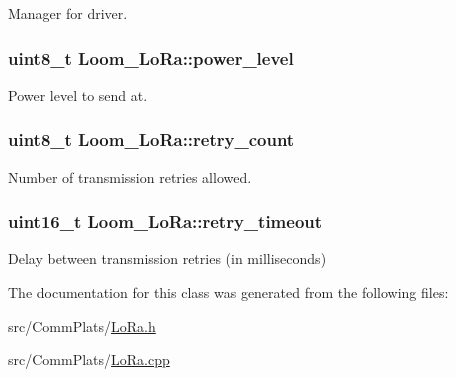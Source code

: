 Manager for driver. 

\subsubsection[{\texorpdfstring{power\+\_\+level}{power_level}}]{\setlength{\rightskip}{0pt plus 5cm}uint8\+\_\+t Loom\+\_\+\+Lo\+Ra\+::power\+\_\+level\hspace{0.3cm}{\ttfamily [protected]}}\hypertarget{class_loom___lo_ra_ab512503f36bb6be6b3134cb66e4cc84c}{}\label{class_loom___lo_ra_ab512503f36bb6be6b3134cb66e4cc84c}


Power level to send at. 

\subsubsection[{\texorpdfstring{retry\+\_\+count}{retry_count}}]{\setlength{\rightskip}{0pt plus 5cm}uint8\+\_\+t Loom\+\_\+\+Lo\+Ra\+::retry\+\_\+count\hspace{0.3cm}{\ttfamily [protected]}}\hypertarget{class_loom___lo_ra_a477a700fccb38f5ac120bdfeb4ed4e4d}{}\label{class_loom___lo_ra_a477a700fccb38f5ac120bdfeb4ed4e4d}


Number of transmission retries allowed. 

\subsubsection[{\texorpdfstring{retry\+\_\+timeout}{retry_timeout}}]{\setlength{\rightskip}{0pt plus 5cm}uint16\+\_\+t Loom\+\_\+\+Lo\+Ra\+::retry\+\_\+timeout\hspace{0.3cm}{\ttfamily [protected]}}\hypertarget{class_loom___lo_ra_ad3f2a482ed0ec0c7ecc3ca2e64b47ef9}{}\label{class_loom___lo_ra_ad3f2a482ed0ec0c7ecc3ca2e64b47ef9}


Delay between transmission retries (in milliseconds) 



The documentation for this class was generated from the following files\+:\begin{DoxyCompactItemize}
\item 
src/\+Comm\+Plats/\hyperlink{_lo_ra_8h}{Lo\+Ra.\+h}\item 
src/\+Comm\+Plats/\hyperlink{_lo_ra_8cpp}{Lo\+Ra.\+cpp}\end{DoxyCompactItemize}
